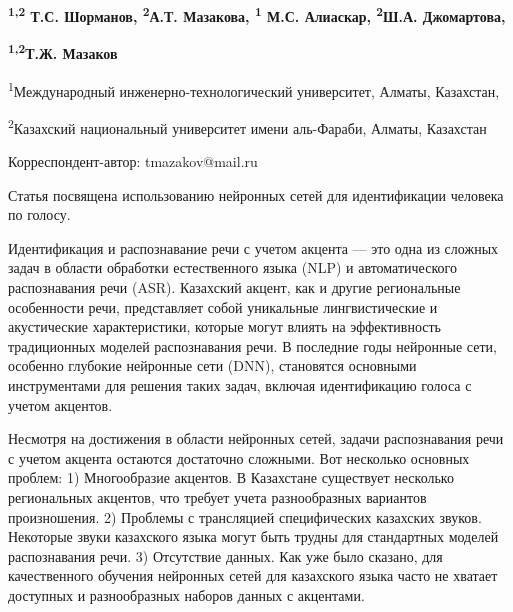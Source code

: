
\begin{articleheader}

{\bfseries \textsuperscript{1,2} Т.С. Шорманов, \textsuperscript{2}А.Т.
Мазакова, \textsuperscript{1} М.С. Алиаскар, \textsuperscript{2}Ш.А.
Джомартова,}

{\bfseries \textsuperscript{1,2}Т.Ж. Мазаков\textsuperscript{\envelope }}
\end{articleheader}

\begin{affiliation}
\textsuperscript{1}Международный инженерно-технологический университет,
Алматы, Казахстан,

\textsuperscript{2}Казахский национальный университет имени аль-Фараби,
Алматы, Казахстан

\raggedright {\bfseries \textsuperscript{\envelope }}Корреспондент-автор: tmazakov@mail.ru
\end{affiliation}

Статья посвящена использованию нейронных сетей для идентификации
человека по голосу.

Идентификация и распознавание речи с учетом акцента --- это одна из
сложных задач в области обработки естественного языка (NLP) и
автоматического распознавания речи (ASR). Казахский акцент, как и другие
региональные особенности речи, представляет собой уникальные
лингвистические и акустические характеристики, которые могут влиять на
эффективность традиционных моделей распознавания речи. В последние годы
нейронные сети, особенно глубокие нейронные сети (DNN), становятся
основными инструментами для решения таких задач, включая идентификацию
голоса с учетом акцентов.

Несмотря на достижения в области нейронных сетей, задачи распознавания
речи с учетом акцента остаются достаточно сложными. Вот несколько
основных проблем: 1) Многообразие акцентов. В Казахстане существует
несколько региональных акцентов, что требует учета разнообразных
вариантов произношения. 2) Проблемы с трансляцией специфических
казахских звуков. Некоторые звуки казахского языка могут быть трудны для
стандартных моделей распознавания речи. 3) Отсутствие данных. Как уже
было сказано, для качественного обучения нейронных сетей для казахского
языка часто не хватает доступных и разнообразных наборов данных с
акцентами.

